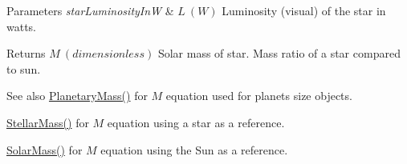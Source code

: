 \begin{DoxyParams}{Parameters}
{\em star\+Luminosity\+InW} & $L\ (W)$ Luminosity (visual) of the star in watts. \\
\hline
\end{DoxyParams}
\begin{DoxyReturn}{Returns}
$M\ (dimensionless)$ Solar mass of star. Mass ratio of a star compared to sun. 
\end{DoxyReturn}
\begin{DoxySeeAlso}{See also}
\mbox{\hyperlink{group___e_g_x_phys-_planetary_mass_ga225bcf56fb37468f6d4d46493d403503}{Planetary\+Mass()}} for $M$ equation used for planets size objects. 

\mbox{\hyperlink{group___e_g_x_phys-_stellar_mass_ga6c1b42cfd62e3174709ddbf15a87b460}{Stellar\+Mass()}} for $M$ equation using a star as a reference. 

\mbox{\hyperlink{group___e_g_x_phys-_stellar_mass_ga4988f903a27ec9cfa63f72b003d876fd}{Solar\+Mass()}} for $M$ equation using the Sun as a reference. 
\end{DoxySeeAlso}
